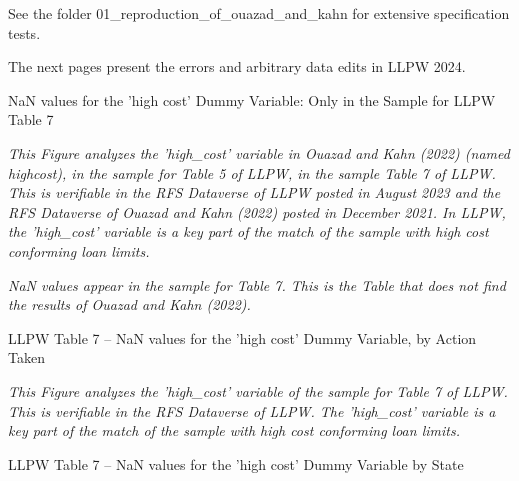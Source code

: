 \documentclass{article}
\begin{document}
See the folder 01\_reproduction\_of\_ouazad\_and\_kahn for extensive specification tests.

The next pages present the errors and arbitrary data edits in LLPW 2024.

\clearpage

\bigskip

\begin{table}

\caption{NaN values for the 'high cost' Dummy Variable: Only in the Sample for LLPW Table 7}

\emph{This Figure analyzes the 'high\_cost' variable in Ouazad and Kahn (2022) (named highcost), in the sample for Table 5 of LLPW, in the sample Table 7 of LLPW. This is verifiable in the RFS Dataverse of LLPW posted in August 2023 and the RFS Dataverse of Ouazad and Kahn (2022) posted in December 2021. In LLPW, the 'high\_cost' variable is a key part of the match of the sample with high cost conforming loan limits.}

\begin{center}

\end{center}

\emph{NaN values appear in the sample for Table 7. This is the Table that does not find the results of Ouazad and Kahn (2022).}

\end{table}

\begin{table}
\caption{LLPW Table 7 -- NaN values for the 'high cost' Dummy Variable, by Action Taken}

\emph{This Figure analyzes the 'high\_cost' variable of the sample for Table 7 of LLPW. This is verifiable in the RFS Dataverse of LLPW. The 'high\_cost' variable is a key part of the match of the sample with high cost conforming loan limits.}

\begin{center}

\end{center}

\end{table}

\begin{table}
\caption{LLPW Table 7 -- NaN values for the 'high cost' Dummy Variable by State}
\begin{center}

\end{center}
    
\end{table}
\end{document}
